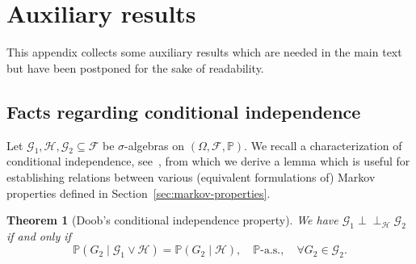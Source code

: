 \documentclass[reqno]{amsart}
\numberwithin{equation}{section}
\newcommand{\bbP}{\mathbb{P}}
\newcommand{\cF}{\mathcal{F}}
\newcommand{\cG}{\mathcal{G}}
\newcommand{\cH}{\mathcal{H}}
\newcommand{\ind}{\perp\!\!\!\perp}
\newtheorem{theorem}[lemma]{Theorem}
\theoremstyle{remark}
\theoremstyle{definition}
\begin{document}
\section{Auxiliary results}\label{app:aux}
This appendix collects some auxiliary results which
are needed in the main text but have been postponed for
the sake of readability.

\subsection{Facts regarding conditional independence}

Let $\cG_1,\cH, \cG_2\subseteq \cF$ be $\sigma$-algebras on $(\Omega, \cF, \bbP)$.
We recall a characterization of conditional independence, see~\cite[Theorem~8.9]{Kallenberg2002}, 
from which we derive a lemma which is useful for establishing relations between 
various (equivalent formulations of) Markov properties defined in Section~\ref{sec:markov-properties}.

\begin{theorem}[Doob's conditional independence property]\label{thm:Doob-cond-ind}
	We have $\cG_1 \ind_{\cH} \cG_2$ if and only if
	\begin{equation}
		\bbP(G_2 \mid \cG_1 \vee \cH) = \bbP(G_2 \mid \cH),
		\quad \bbP\text{-a.s.}, 
		\quad 
		\forall G_2 \in \cG_2.
	\end{equation}
\end{theorem}
\end{document}
